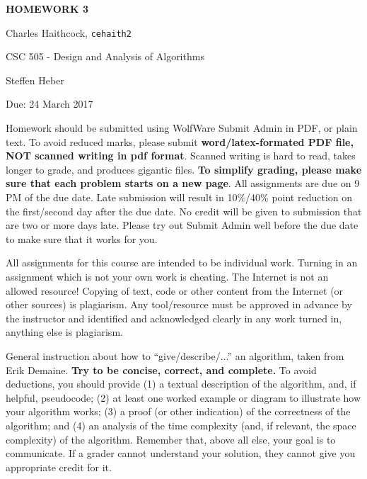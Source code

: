 \documentclass{article}
\newcommand{\homeworktitle}{\uppercase{Homework 3}}
\newcommand{\homeworkauthor}{Charles Haithcock}
\newcommand{\unityid}{cehaith2}
\newcommand{\duedate}{Due: 24 March 2017}
\newcommand{\coursetitle}{CSC 505 - Design and Analysis of Algorithms}
\newcommand{\instructor}{Steffen Heber}
\begin{document}
\begin{center}
    \huge\textbf{\homeworktitle}
\end{center}
\vspace{1cm}

\begin{center}
    \large\homeworkauthor, \texttt{\unityid}
\end{center}
\vspace{1cm}

\begin{center}
    \large\coursetitle 
    
    \instructor
\end{center}
\vspace{1cm}

\begin{center}
    \large\duedate
\end{center}
\vspace{1cm}

\newpage




Homework should be submitted using WolfWare Submit Admin in PDF, or plain text. 
To avoid reduced marks, please submit \textbf{word/latex-formated PDF file, NOT 
scanned writing in pdf format}. Scanned writing is hard to read, takes longer to
 grade, and produces gigantic files. \textbf{To simplify grading, please make 
sure that each problem starts on a new page}. All assignments are due on 9 PM of
the due date. Late submission will result in 10\%/40\% point reduction on the 
first/second day after the due date. No credit will be given to submission that 
are two or more days late. Please try out Submit Admin well before the due date 
to make sure that it works for you.

All assignments for this course are intended to be individual work. Turning in 
an assignment which is not your own work is cheating. The Internet is not an 
allowed resource! Copying of text, code or other content from the Internet (or 
other sources) is plagiarism. Any tool/resource must be approved in advance by 
the instructor and identified and acknowledged clearly in any work turned in, 
anything else is plagiarism.

General instruction about how to “give/describe/...” an algorithm, taken from 
Erik Demaine. \textbf{Try to be concise, correct, and complete.} To avoid 
deductions, you should provide (1) a textual description of the algorithm, and, 
if helpful, pseudocode; (2) at least one worked example or diagram to illustrate
how your algorithm works; (3) a proof (or other indication) of the correctness 
of the algorithm; and (4) an analysis of the time complexity (and, if relevant, 
the space complexity) of the algorithm. Remember that, above all else, your goal
is to communicate. If a grader cannot understand your solution, they cannot give
you appropriate credit for it.
\end{document}
